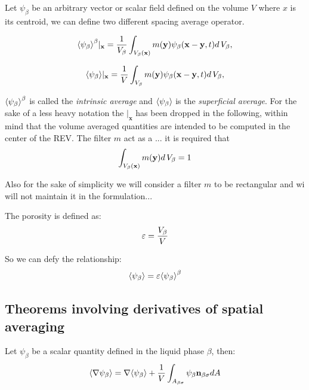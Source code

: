 Let $\psi_{\beta}$ be an arbitrary vector or scalar field defined on the volume $V$ where $x$ is its centroid, we can define two different spacing average operator.

\begin{equation}
{\left< \psi_{\beta} \right>}^{\beta}|_{\mathbf{x}} = \dfrac{1}{V_\beta} \int_{V_\beta(\mathbf{x})}  m(\mathbf{y}) \psi_{\beta}(\mathbf{x}-\mathbf{y}, t) d \, V_\beta,
\label{eq:avg_intrinsic}
\end{equation}

\begin{equation}
{\left< \psi_{\beta} \right>}|_{\mathbf{x}} = \dfrac{1}{V} \int_{V_\beta} m(\mathbf{y}) \psi_{\beta}(\mathbf{x}-\mathbf{y}, t) d \, V_\beta,
\label{eq:avg_superficial}
\end{equation}

${\left< \psi_{\beta} \right>}^{\beta}$ is called the \textit{intrinsic average} and ${\left< \psi_{\beta} \right>}$ is the \textit{superficial average}.
For the sake of a less heavy notation the $|_{\mathbf{x}}$ has been dropped in the following, within mind that the volume averaged quantities are intended to be computed in the center of the REV.
The filter $m$ act as a ... it is required that
$$
\int_{V_\beta(\mathbf{x})}  m(\mathbf{y}) d \, V_\beta = 1
$$

Also for the sake of simplicity we will consider a filter $m$ to be rectangular and wi will not maintain it in the formulation...

The porosity is defined as:
\begin{equation}
	\varepsilon = \dfrac{V_\beta}{V}
	\label{eq:porosity}
\end{equation}

So we can defy the relationship:
\begin{equation}
	{\left< \psi_{\beta} \right>} =  \varepsilon {\left< \psi_{\beta} \right>}^{\beta}
\end{equation}

\subsection{Theorems involving derivatives of spatial averaging}

\begin{theorem}
Let $\psi_{\beta}$ be a scalar quantity defined in the liquid phase $\beta$, then:
	\begin{equation}
		{\left< \nabla \psi_{\beta} \right>} = \nabla {\left< \psi_{\beta} \right>} + \dfrac{1}{V} \int_{A_{\beta \sigma}} \psi_{\beta} \mathbf{n}_{\beta \sigma}  dA
			\label{th:spat_avg}
	\end{equation}
\end{theorem}

